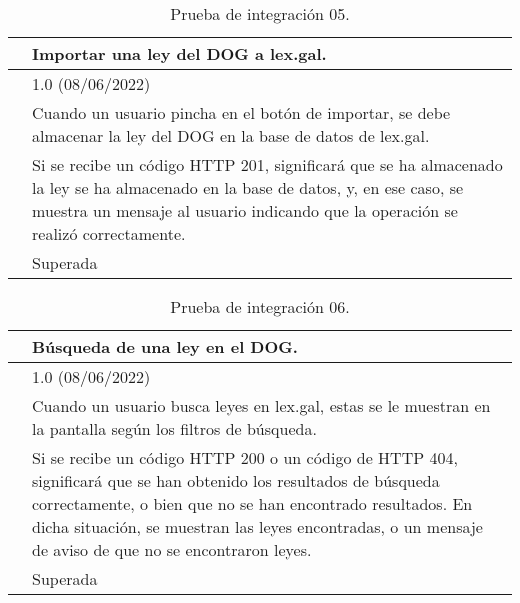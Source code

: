 \begin{table}[H]
\begin{center}
\begin{tabular}{|p{3cm}|p{10cm}|} \hline
\centering {\bf PI-05} & Importar una ley del DOG a lex.gal.  \\ \hline\hline
\centering {\bf Versión} & 1.0 (08/06/2022) \\ \hline
\centering {\bf Descripción} & Cuando un usuario pincha en el botón de importar, se debe almacenar la ley del DOG en la base de datos de lex.gal. \\ \hline
\centering {\bf Criterio de aceptación} & Si se recibe un código HTTP 201, significará que se ha almacenado la ley se ha almacenado en la base de datos, y, en ese caso, se muestra un mensaje al usuario indicando que la operación se realizó correctamente. \\ \hline
\centering {\bf Estado} & Superada \\ \hline
\end{tabular}
\caption{Prueba de integración 05.}
\label{enlacePI5}
\end{center}
\end{table}

\begin{table}[H]
\begin{center}
\begin{tabular}{|p{3cm}|p{10cm}|} \hline
\centering {\bf PI-06} & Búsqueda de una ley en el DOG.  \\ \hline\hline
\centering {\bf Versión} & 1.0 (08/06/2022) \\ \hline
\centering {\bf Descripción} & Cuando un usuario busca leyes en lex.gal, estas se le muestran en la pantalla según los filtros de búsqueda. \\ \hline
\centering {\bf Criterio de aceptación} & Si se recibe un código HTTP 200 o un código de HTTP 404, significará que se han obtenido los resultados de búsqueda correctamente, o bien que no se han encontrado resultados. En dicha situación, se muestran las leyes encontradas, o un mensaje de aviso de que no se encontraron leyes. \\ \hline
\centering {\bf Estado} & Superada \\ \hline
\end{tabular}
\caption{Prueba de integración 06.}
\label{enlacePI6}
\end{center}
\end{table}

